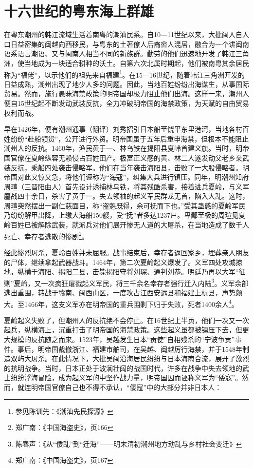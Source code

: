 \section{十六世纪的粤东海上群雄}

在粤东潮州的韩江流域生活着南粤的潮汕民系。自10—11世纪以来，大批闽人自人口日益密集的闽越向西移民，与粤东的土著僚人后裔畲人混居，融合为一个讲闽南语系语言潮语、又与闽南人相当不同的新族群。勤劳的他们迅速地开发了韩江三角洲，使当地成为一块适合耕种的沃土。自第六次北属时期起，他们被南粤其余居民称为“福佬”，以示他们的祖先来自福建\footnote{参见陈训先：《潮汕先民探源》}。在15—16世纪，随着韩江三角洲开发的日益成熟，潮州出现了地少人多的问题。因此，当地百姓纷纷出海谋生，从事国际贸易。然而，施行愚昧海禁政策的明帝国却极力阻止他们出海。这样一来，潮州人便自15世纪起不断发动武装反抗，全力冲破明帝国的海禁政策，为天赋的自由贸易权利而战。

早在1426年，便有潮州通事（翻译）刘秀招引日本船至饶平东里港湾，当地各村百姓纷纷“赴船领货”，公开进行外贸。明帝国虽于五年后重申海禁，但根本不能阻止潮州人的反抗。1460年，渔民黄于一、林乌铁在揭阳县夏岭首建义旗。当时，明帝国官僚在夏岭纵容无赖侵占百姓田产。极富正义感的黄、林二人遂发动父老乡亲武装反抗，乘船四处袭击侵略军。他们在当年袭击海阳县，击败了一大股侵略者。明帝国对此又惊又急，将他们诬称为“海寇”，纠集大兵进行镇压。同年，明潮州知府周瑄（三晋阳曲人）首先设计诱捕林乌铁，将其残酷杀害，接着进兵夏岭，与义军鏖战四十余日，杀害了黄于一。失去领袖的起义军民群龙无首，陷入大乱。这时，周瑄突然摆出一副仁慈面目，称“盗魁既得，余可抚而下也。”受其蛊惑的夏岭军民乃纷纷解甲出降，上缴大海船150艘，受“抚”者多达1237户。卑鄙至极的周瑄见夏岭百姓已被解除武装，就派兵对他们展开惨无人道的大屠杀，在当地造成了数千人死亡、幸存者逃散的惨剧\footnote{郑广南：《中国海盗史》，页166}。

经此惨烈屠杀，夏岭百姓并未屈服。战事结束后，幸存者返回家乡，埋葬亲人朋友的尸体，继续拿起武器战斗。1464年，第二次夏岭起义爆发了。义军四处攻城掠地，纵横于海阳、揭阳二县，击毙揭阳守将刘琛、通判刘恭。明廷乃再以大军“征剿”夏岭，又一次疯狂屠戮起义军民，将三千余名幸存者强行迁入内陆\footnote{陈春声：《从“倭乱”到“迁海”——明末清初潮州地方动乱与乡村社会变迁》}。义军余部逃出重围，转战于赣南、闽西山区，一度攻占江西安远县和福建上杭县，声势颇大。至1466年，这支义军亦在明帝国的重兵围剿下归于失败，死者1400余人\footnote{郑广南：《中国海盗史》，页167}。

夏岭起义失败了，但潮州人的反抗绝不会停止。在16世纪上半页，他们一次又一次起兵，纵横海上，沉重打击了明帝国的海禁政策。这些起义虽都被镇压下去，但更大规模的反抗随之而来。1523年，吴越发生日本“贡使”自相残杀的“宁波争贡”事件。事后，明帝国裁撤浙江、福建市舶司，在吴越、闽越厉行海禁，并于1548年制造双屿大屠杀。在此情况下，大批吴闽沿海居民纷纷与日本海商合流，展开了激烈的抗明战争。当时，日本正处于波澜壮阔的战国时代，许多在战争中失去领地的武士纷纷浮海冒险，成为起义军的中坚作战力量，明帝国因而诬称义军为“倭寇”。然而，就连明帝国官僚自己也不得不承认，“倭寇”中的大部分并非日本人：

